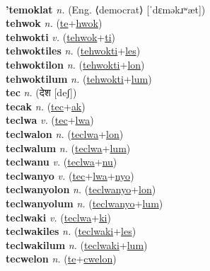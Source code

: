  \label{tensoki} \\
\textbf{'temoklat} \textit{n.} (Eng. ⟨democrat⟩ [ˈdɛməkɹʷæt])
 \label{'temoklat} \\
\textbf{tehwok} \textit{n.} (\hyperref[te]{te}+\hyperref[hwok]{hwok})
 \label{tehwok} \\
\textbf{tehwokti} \textit{v.} (\hyperref[tehwok]{tehwok}+\hyperref[ti]{ti})
 \label{tehwokti} \\
\textbf{tehwoktiles} \textit{n.} (\hyperref[tehwokti]{tehwokti}+\hyperref[les]{les})
 \label{tehwoktiles} \\
\textbf{tehwoktilon} \textit{n.} (\hyperref[tehwokti]{tehwokti}+\hyperref[lon]{lon})
 \label{tehwoktilon} \\
\textbf{tehwoktilum} \textit{n.} (\hyperref[tehwokti]{tehwokti}+\hyperref[lum]{lum})
 \label{tehwoktilum} \\
\textbf{tec} \textit{n.} ({\devanagari{}देश} [deʃ])
 \label{tec} \\
\textbf{tecak} \textit{n.} (\hyperref[tec]{tec}+\hyperref[ak]{ak})
 \label{tecak} \\
\textbf{teclwa} \textit{v.} (\hyperref[tec]{tec}+\hyperref[lwa]{lwa})
 \label{teclwa} \\
\textbf{teclwalon} \textit{n.} (\hyperref[teclwa]{teclwa}+\hyperref[lon]{lon})
 \label{teclwalon} \\
\textbf{teclwalum} \textit{n.} (\hyperref[teclwa]{teclwa}+\hyperref[lum]{lum})
 \label{teclwalum} \\
\textbf{teclwanu} \textit{v.} (\hyperref[teclwa]{teclwa}+\hyperref[nu]{nu})
 \label{teclwanu} \\
\textbf{teclwanyo} \textit{v.} (\hyperref[tec]{tec}+\hyperref[lwa]{lwa}+\hyperref[nyo]{nyo})
 \label{teclwanyo} \\
\textbf{teclwanyolon} \textit{n.} (\hyperref[teclwanyo]{teclwanyo}+\hyperref[lon]{lon})
 \label{teclwanyolon} \\
\textbf{teclwanyolum} \textit{n.} (\hyperref[teclwanyo]{teclwanyo}+\hyperref[lum]{lum})
 \label{teclwanyolum} \\
\textbf{teclwaki} \textit{v.} (\hyperref[teclwa]{teclwa}+\hyperref[ki]{ki})
 \label{teclwaki} \\
\textbf{teclwakiles} \textit{n.} (\hyperref[teclwaki]{teclwaki}+\hyperref[les]{les})
 \label{teclwakiles} \\
\textbf{teclwakilum} \textit{n.} (\hyperref[teclwaki]{teclwaki}+\hyperref[lum]{lum})
 \label{teclwakilum} \\
\textbf{tecwelon} \textit{n.} (\hyperref[te]{te}+\hyperref[cwelon]{cwelon})
